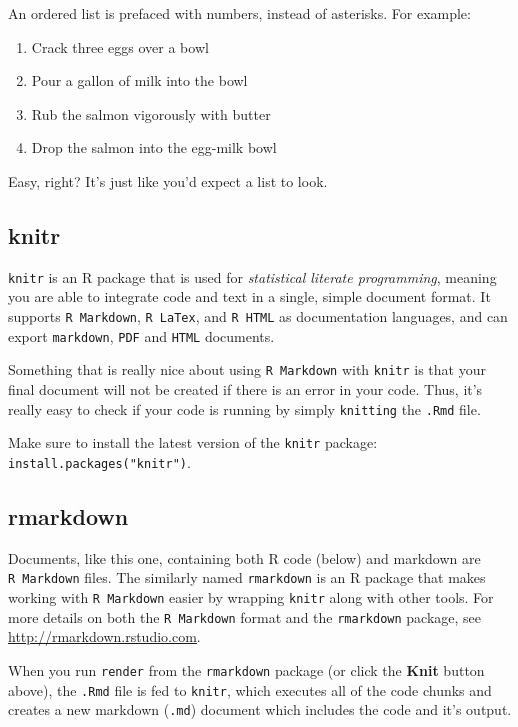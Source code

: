 \documentclass[
]{article}
\providecommand{\tightlist}{%
  \setlength{\itemsep}{0pt}\setlength{\parskip}{0pt}}
\begin{document}
An ordered list is prefaced with numbers, instead of asterisks. For
example:

\begin{enumerate}
\def\labelenumi{\arabic{enumi}.}
\tightlist
\item
  Crack three eggs over a bowl
\item
  Pour a gallon of milk into the bowl
\item
  Rub the salmon vigorously with butter
\item
  Drop the salmon into the egg-milk bowl
\end{enumerate}

Easy, right? It's just like you'd expect a list to look.

\hypertarget{knitr}{%
\subsection{knitr}\label{knitr}}

\texttt{knitr} is an R package that is used for \emph{statistical
literate programming}, meaning you are able to integrate code and text
in a single, simple document format. It supports \texttt{R\ Markdown},
\texttt{R\ LaTex}, and \texttt{R\ HTML} as documentation languages, and
can export \texttt{markdown}, \texttt{PDF} and \texttt{HTML} documents.

Something that is really nice about using \texttt{R\ Markdown} with
\texttt{knitr} is that your final document will not be created if there
is an error in your code. Thus, it's really easy to check if your code
is running by simply \texttt{knitting} the \texttt{.Rmd} file.

Make sure to install the latest version of the \texttt{knitr} package:
\texttt{install.packages("knitr")}.

\hypertarget{rmarkdown}{%
\subsection{rmarkdown}\label{rmarkdown}}

Documents, like this one, containing both R code (below) and markdown
are \texttt{R\ Markdown} files. The similarly named \texttt{rmarkdown}
is an R package that makes working with \texttt{R\ Markdown} easier by
wrapping \texttt{knitr} along with other tools. For more details on both
the \texttt{R\ Markdown} format and the \texttt{rmarkdown} package, see
\url{http://rmarkdown.rstudio.com}.

When you run \texttt{render} from the \texttt{rmarkdown} package (or
click the \textbf{Knit} button above), the \texttt{.Rmd} file is fed to
\texttt{knitr}, which executes all of the code chunks and creates a new
markdown (\texttt{.md}) document which includes the code and it's
output.
\end{document}
